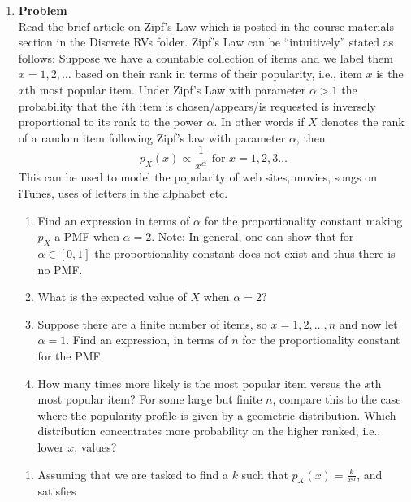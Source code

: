 \documentclass[12pt]{article}
\newenvironment{Ex}{\textbf{Problem}\vspace{.75em}\\}{}
\begin{document}
\begin{enumerate}
  \item
    \begin{Ex}
      Read the brief article on Zipf's Law which is posted in the
      course materials section in the Discrete RVs folder. Zipf's Law
      can be ``intuitively'' stated as follows: Suppose we have a
      countable collection of items and we label them $x = 1,2,
      \ldots$ based on their rank in terms of their popularity, i.e.,
      item $x$ is the $x$th most popular item. Under Zipf's Law with
      parameter $\alpha > 1$ the probability that the $i$th item is
      chosen/appears/is requested is inversely proportional to its
      rank to the power $\alpha$. In other words if $X$ denotes the
      rank of a random item following Zipf's law with parameter
      $\alpha$, then
      \begin{equation}
        \label{eq:zipfs-prob}
        p_X(x) \propto \frac{1}{x^\alpha} \text{ for } x = 1, 2, 3 \ldots
    \end{equation}
      This can be used to model the popularity of web sites, movies,
      songs on iTunes, uses of letters in the alphabet etc.
      \begin{enumerate}
      \item Find an expression in terms of $\alpha$ for the
        proportionality constant making $p_X$ a PMF when $\alpha =
        2$. Note: In general, one can show that for $\alpha \in [0,
        1]$ the proportionality constant does not exist and thus there
        is no PMF.
      \item What is the expected value of $X$ when $\alpha = 2$?
      \item Suppose there are a finite number of items, so $x =
        1,2,\ldots, n$ and now let $\alpha = 1$. Find an expression,
        in terms of $n$ for the proportionality constant for the PMF.
      \item How many times more likely is the most popular item versus
        the $x$th most popular item? For some large but finite $n$,
        compare this to the case where the popularity profile is given
        by a geometric distribution. Which distribution concentrates
        more probability on the higher ranked, i.e., lower $x$,
        values?
      \end{enumerate}
      \begin{solution} \hfill
        \begin{enumerate}
        \item Assuming that we are tasked to find a $k$ such that
          $p_X(x) = \frac{k}{x^\alpha}$, and satisfies

\end{enumerate}
\end{solution}
\end{Ex}
\end{enumerate}
\end{document}
